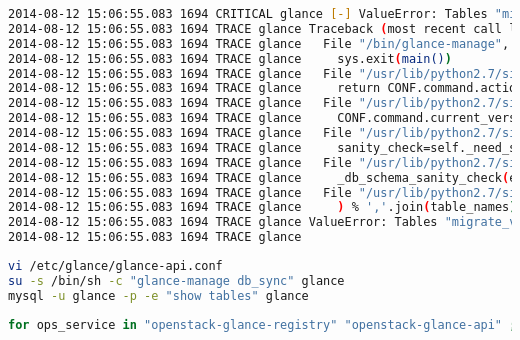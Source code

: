 \documentclass[11pt,letterpaper,oneside]{book}
\begin{document}
\begin{lstlisting}[numbers=none,caption={\href{https://bugzilla.redhat.com/show_bug.cgi?id=1090648}{Bugzilla 1090648 - glance-manage db\_sync silently fails to prepare the database}},language=bash]
2014-08-12 15:06:55.083 1694 CRITICAL glance [-] ValueError: Tables "migrate_version" have non utf8 collation, please make sure all tables are CHARSET=utf8
2014-08-12 15:06:55.083 1694 TRACE glance Traceback (most recent call last):
2014-08-12 15:06:55.083 1694 TRACE glance   File "/bin/glance-manage", line 10, in <module>
2014-08-12 15:06:55.083 1694 TRACE glance     sys.exit(main())
2014-08-12 15:06:55.083 1694 TRACE glance   File "/usr/lib/python2.7/site-packages/glance/cmd/manage.py", line 259, in main
2014-08-12 15:06:55.083 1694 TRACE glance     return CONF.command.action_fn()
2014-08-12 15:06:55.083 1694 TRACE glance   File "/usr/lib/python2.7/site-packages/glance/cmd/manage.py", line 160, in sync
2014-08-12 15:06:55.083 1694 TRACE glance     CONF.command.current_version)
2014-08-12 15:06:55.083 1694 TRACE glance   File "/usr/lib/python2.7/site-packages/glance/cmd/manage.py", line 137, in sync
2014-08-12 15:06:55.083 1694 TRACE glance     sanity_check=self._need_sanity_check())
2014-08-12 15:06:55.083 1694 TRACE glance   File "/usr/lib/python2.7/site-packages/glance/openstack/common/db/sqlalchemy/migration.py", line 195, in db_sync
2014-08-12 15:06:55.083 1694 TRACE glance     _db_schema_sanity_check(engine)
2014-08-12 15:06:55.083 1694 TRACE glance   File "/usr/lib/python2.7/site-packages/glance/openstack/common/db/sqlalchemy/migration.py", line 221, in _db_schema_sanity_check
2014-08-12 15:06:55.083 1694 TRACE glance     ) % ','.join(table_names))
2014-08-12 15:06:55.083 1694 TRACE glance ValueError: Tables "migrate_version" have non utf8 collation, please make sure all tables are CHARSET=utf8
2014-08-12 15:06:55.083 1694 TRACE glance
\end{lstlisting}

\begin{lstlisting}[caption={Workaround - db\_enforce\_mysql\_charset=False },language=bash]
vi /etc/glance/glance-api.conf 
su -s /bin/sh -c "glance-manage db_sync" glance
mysql -u glance -p -e "show tables" glance
\end{lstlisting}
\begin{lstlisting}[caption={Start and enable Glance Services},language=bash]
for ops_service in "openstack-glance-registry" "openstack-glance-api" ; do systemctl enable $ops_service; systemctl start $ops_service; done

\end{lstlisting}
\end{document}
